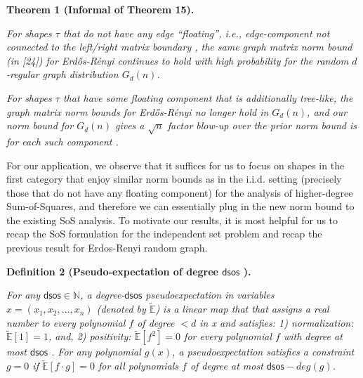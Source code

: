

\par\medskip\noindent\textbf{
\textbf{Theorem 1}\textbf{ }(Informal of Theorem 15)\textbf{.}
}\par



\emph{For shapes $\tau$ that do not have any edge “floating”, i.e., edge-component not connected to the left/right matrix boundary , the same graph matrix norm bound (in [24]) for Erdős-Rényi continues to hold with high probability for the random $d$-regular graph distribution $G_{d}(n)$.}\par




\emph{For shapes $\tau$ that have some floating component that is additionally tree-like, the graph matrix norm bounds for Erdős-Rényi no longer hold in $G_{d}(n)$, and our norm bound for $G_{d}(n)$ gives a $\sqrt{n}$ factor blow-up over the prior norm bound is for each such component .}\par






For our application, we observe that it suffices for us to focus on shapes in the first category that enjoy similar norm bounds as in the i.i.d. setting (precisely those that do not have any floating component) for the analysis of higher-degree Sum-of-Squares, and therefore we can essentially plug in the new norm bound to the existing SoS analysis. To motivate our results, it is most helpful for us to recap the SoS formulation for the independent set problem and recap the
previous result for Erdos-Renyi random graph.\par





\par\medskip\noindent\textbf{
\textbf{Definition 2}\textbf{ }(Pseudo-expectation of degree $\mathsf{dsos}$ )\textbf{.}
}\par



\emph{For any $\mathsf{dsos}\in\mathbb{N}$, a degree-$\mathsf{dsos}$ pseudoexpectation in variables $x=(x_{1},x_{2},\dots,x_{n})$ (denoted by $\widetilde{\mathbb{E}}$) is a linear map that that assigns a real number to every polynomial $f$ of degree $<d$ in x and satisfies: 1) normalization: $\widetilde{\mathbb{E}}[1]=1$, and, 2) positivity: $\widetilde{\mathbb{E}}[f^{2}]=0$ for every polynomial $f$ with degree at most $\mathsf{dsos}$ . For any polynomial $g(x)$, a pseudoexpectation satisfies a constraint $g=0$ if $\widetilde{\mathbb{E}}[f\cdot g]=0$ for all polynomials $f$ of degree at most
$\mathsf{dsos}-deg(g)$.}\par



